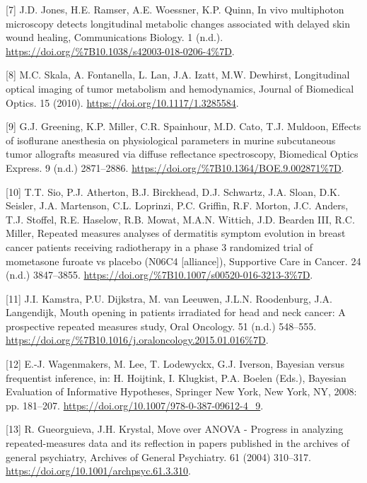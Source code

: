 \documentclass[
]{article}
\begin{document}
\leavevmode\hypertarget{ref-jones2018}{}%
{[}7{]} J.D. Jones, H.E. Ramser, A.E. Woessner, K.P. Quinn, In vivo multiphoton microscopy detects longitudinal metabolic changes associated with delayed skin wound healing, Communications Biology. 1 (n.d.). \url{https://doi.org/\%7B10.1038/s42003-018-0206-4\%7D}.

\leavevmode\hypertarget{ref-skala2010}{}%
{[}8{]} M.C. Skala, A. Fontanella, L. Lan, J.A. Izatt, M.W. Dewhirst, Longitudinal optical imaging of tumor metabolism and hemodynamics, Journal of Biomedical Optics. 15 (2010). \url{https://doi.org/10.1117/1.3285584}.

\leavevmode\hypertarget{ref-greening2018}{}%
{[}9{]} G.J. Greening, K.P. Miller, C.R. Spainhour, M.D. Cato, T.J. Muldoon, Effects of isoflurane anesthesia on physiological parameters in murine subcutaneous tumor allografts measured via diffuse reflectance spectroscopy, Biomedical Optics Express. 9 (n.d.) 2871--2886. \url{https://doi.org/\%7B10.1364/BOE.9.002871\%7D}.

\leavevmode\hypertarget{ref-sio2016}{}%
{[}10{]} T.T. Sio, P.J. Atherton, B.J. Birckhead, D.J. Schwartz, J.A. Sloan, D.K. Seisler, J.A. Martenson, C.L. Loprinzi, P.C. Griffin, R.F. Morton, J.C. Anders, T.J. Stoffel, R.E. Haselow, R.B. Mowat, M.A.N. Wittich, J.D. Bearden III, R.C. Miller, Repeated measures analyses of dermatitis symptom evolution in breast cancer patients receiving radiotherapy in a phase 3 randomized trial of mometasone furoate vs placebo (N06C4 {[}alliance{]}), Supportive Care in Cancer. 24 (n.d.) 3847--3855. \url{https://doi.org/\%7B10.1007/s00520-016-3213-3\%7D}.

\leavevmode\hypertarget{ref-kamstra2015}{}%
{[}11{]} J.I. Kamstra, P.U. Dijkstra, M. van Leeuwen, J.L.N. Roodenburg, J.A. Langendijk, Mouth opening in patients irradiated for head and neck cancer: A prospective repeated measures study, Oral Oncology. 51 (n.d.) 548--555. \url{https://doi.org/\%7B10.1016/j.oraloncology.2015.01.016\%7D}.

\leavevmode\hypertarget{ref-wagenmakers2008}{}%
{[}12{]} E.-J. Wagenmakers, M. Lee, T. Lodewyckx, G.J. Iverson, Bayesian versus frequentist inference, in: H. Hoijtink, I. Klugkist, P.A. Boelen (Eds.), Bayesian Evaluation of Informative Hypotheses, Springer New York, New York, NY, 2008: pp. 181--207. \url{https://doi.org/10.1007/978-0-387-09612-4_9}.

\leavevmode\hypertarget{ref-gueorguieva2004}{}%
{[}13{]} R. Gueorguieva, J.H. Krystal, Move over ANOVA - Progress in analyzing repeated-measures data and its reflection in papers published in the archives of general psychiatry, Archives of General Psychiatry. 61 (2004) 310--317. \url{https://doi.org/10.1001/archpsyc.61.3.310}.
\end{document}
